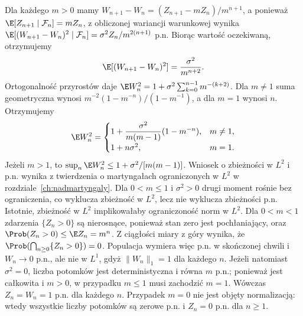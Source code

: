 \begin{przyklad}
Dla każdego $m>0$ mamy
$W_{n+1}-W_n=(Z_{n+1}-mZ_n)/m^{n+1}$,
a ponieważ $\E[Z_{n+1}\mid\mathcal F_n]=mZ_n$,
z obliczonej wariancji warunkowej wynika
$\E[(W_{n+1}-W_n)^2\mid\mathcal F_n]
=\sigma^2 Z_n/m^{2(n+1)}$ p.n.
Biorąc wartość oczekiwaną, otrzymujemy
\[
\E[(W_{n+1}-W_n)^2]=\frac{\sigma^2}{m^{n+2}}.
\]
Ortogonalność przyrostów daje
$\E W_n^2=1+\sigma^2\sum_{k=0}^{n-1}m^{-(k+2)}$.
Dla $m\ne1$ suma geometryczna wynosi
$m^{-2}(1-m^{-n})/(1-m^{-1})$,
a dla $m=1$ wynosi $n$. Otrzymujemy
\[
\E W_n^2=
\begin{cases}
1+\dfrac{\sigma^2}{m(m-1)}(1-m^{-n}),&m\ne1,\\[4pt]
1+n\sigma^2,&m=1.
\end{cases}
\]
Jeżeli $m>1$, to
$\sup_n\E W_n^2\leq1+\sigma^2/[m(m-1)]$.
Wniosek o zbieżności w $L^2$ i p.n. wynika
z twierdzenia o martyngałach ograniczonych w $L^2$
w rozdziale~\ref{ch:nadmartyngaly}.
Dla $0<m\leq1$ i $\sigma^2>0$ drugi moment
rośnie bez ograniczenia, co wyklucza zbieżność
w $L^2$, lecz nie wyklucza zbieżności p.n.
Istotnie, zbieżność w $L^2$ implikowałaby
ograniczoność norm w $L^2$.
Dla $0<m<1$ zdarzenia $\{Z_n>0\}$ są
nierosnące, ponieważ stan zero jest pochłaniający,
oraz $\Prob(Z_n>0)\leq\E Z_n=m^n$.
Z ciągłości miary z góry wynika, że
$\Prob(\bigcap_{n\geq0}\{Z_n>0\})=0$.
Populacja wymiera więc p.n. w skończonej chwili
i $W_n\to0$ p.n., ale nie w $L^1$, gdyż
$\|W_n\|_1=1$ dla każdego $n$. Jeżeli natomiast $\sigma^2=0$,
liczba potomków jest deterministyczna i równa $m$
p.n.; ponieważ jest całkowita i $m>0$,
w przypadku $m\leq1$ musi zachodzić $m=1$.
Wówczas $Z_n=W_n=1$ p.n. dla każdego $n$.
Przypadek $m=0$ nie jest objęty normalizacją:
wtedy wszystkie liczby potomków są zerowe p.n.
i $Z_n=0$ p.n. dla $n\geq1$.
\end{przyklad}


